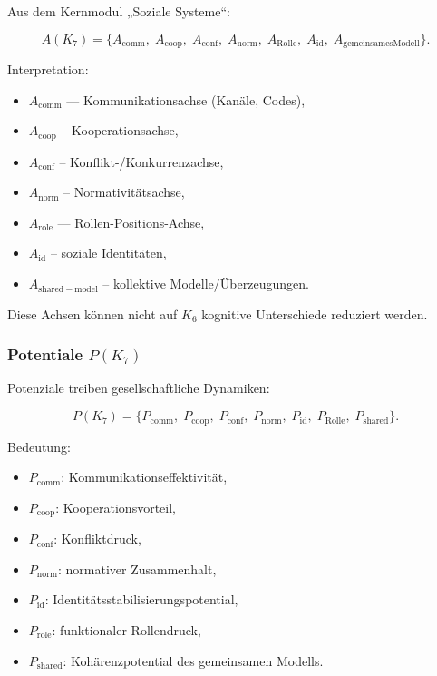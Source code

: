 Aus dem Kernmodul „Soziale Systeme“:

\[
A(K_7)=
\{
A_{\mathrm{comm}},\;
A_{\mathrm{coop}},\;
A_{\mathrm{conf}},\;
A_{\mathrm{norm}},\;
A_{\mathrm{Rolle}},\;
A_{\mathrm{id}},\;
A_{\mathrm{gemeinsames Modell}}
\}.
\]

Interpretation:
\begin{itemize}
    \item $A_{\mathrm{comm}}$ — Kommunikationsachse (Kanäle, Codes),
    \item $A_{\mathrm{coop}}$ – Kooperationsachse,
    \item $A_{\mathrm{conf}}$ – Konflikt-/Konkurrenzachse,
    \item $A_{\mathrm{norm}}$ – Normativitätsachse,
    \item $A_{\mathrm{role}}$ — Rollen-Positions-Achse,
    \item $A_{\mathrm{id}}$ – soziale Identitäten,
    \item $A_{\mathrm{shared-model}}$ – kollektive Modelle/Überzeugungen.
\end{itemize}

Diese Achsen können nicht auf $K_6$ kognitive Unterschiede reduziert werden.

\subsubsection{Potentiale \texorpdfstring{$P(K_7)$}{P(K_7)}}

Potenziale treiben gesellschaftliche Dynamiken:

\[
P(K_7)=
\{
P_{\mathrm{comm}},\;
P_{\mathrm{coop}},\;
P_{\mathrm{conf}},\;
P_{\mathrm{norm}},\;
P_{\mathrm{id}},\;
P_{\mathrm{Rolle}},\;
P_{\mathrm{shared}}
\}.
\]

Bedeutung:
\begin{itemize}
    \item $P_{\mathrm{comm}}$: Kommunikationseffektivität,
    \item $P_{\mathrm{coop}}$: Kooperationsvorteil,
    \item $P_{\mathrm{conf}}$: Konfliktdruck,
    \item $P_{\mathrm{norm}}$: normativer Zusammenhalt,
    \item $P_{\mathrm{id}}$: Identitätsstabilisierungspotential,
    \item $P_{\mathrm{role}}$: funktionaler Rollendruck,
    \item $P_{\mathrm{shared}}$: Kohärenzpotential des gemeinsamen Modells.
\end{itemize}

